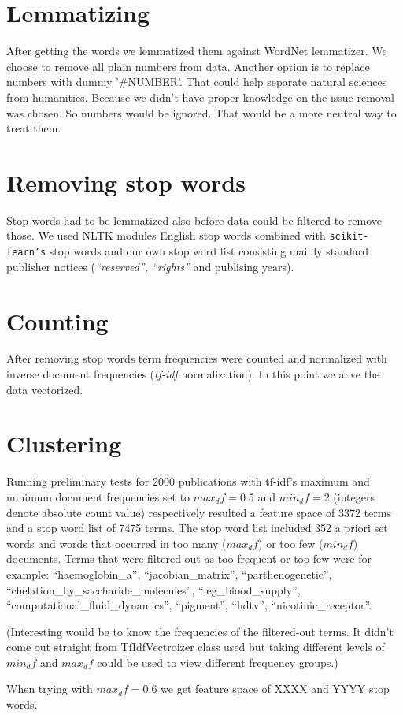 \section{Lemmatizing}
After getting the words we lemmatized them against WordNet 
lemmatizer.
We choose to remove all plain numbers from
data. Another option is to replace numbers with dummy '\#NUMBER'.
That could help separate natural sciences from humanities. Because 
we didn't have proper knowledge on the issue removal was chosen. So 
numbers would be ignored. That would be a more neutral way to treat 
them. 

\section{Removing stop words}
Stop words had to be lemmatized also before data could be 
filtered to remove those. We used NLTK modules English stop words 
combined with \texttt{scikit-learn's} stop words and our own stop 
word list consisting mainly standard publisher notices 
(\emph{``reserved'', ``rights''} and publising years).

\section{Counting}
After removing stop words term frequencies were counted and 
normalized with inverse document frequencies (\emph{tf-idf} 
normalization). In this point we ahve the data vectorized.

\section{Clustering}
Running preliminary tests for 2000 publications with tf-idf's maximum and 
minimum document frequencies set to $max_df=0.5$ 
and $min_df=2$ (integers denote absolute count value) respectively
resulted a feature space of 3372 terms and a stop word list of 7475 
terms. The stop word list included 352 a priori set words and words
that occurred in too many ($max_df$) or too few ($min_df$) 
documents. Terms that were filtered out as too frequent or too few
were for example: ``haemoglobin\_a'', ``jacobian\_matrix'', 
``parthenogenetic'', ``chelation\_by\_saccharide\_molecules'', 
``leg\_blood\_supply'', ``computational\_fluid\_dynamics'', 
``pigment'', ``hdtv'', ``nicotinic\_receptor''.

(Interesting would be to know the frequencies of the filtered-out 
terms. It didn't come out straight from TfIdfVectroizer class used 
but taking different levels of $min_df$ and $max_df$ could be used 
to view different frequency groups.)

When trying with $max_df=0.6$ we get feature space of XXXX and 
YYYY stop words.

